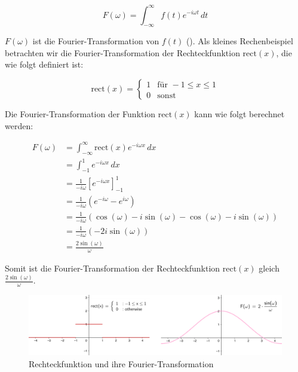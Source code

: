 \documentclass[11pt,a4paper]{article}
\begin{document}
\begin{equation*}
	F(\omega) = \int_{-\infty}^{\infty} f(t) e^{-i \omega t} \, dt
	\label{eq:fourier_transform}
\end{equation*}

\noindent
\(F(\omega)\) ist die Fourier-Transformation von \(f(t)\)
(\cite[49:27]{weitz2023fourier}). Als kleines Rechenbeispiel betrachten wir die
Fourier-Transformation der Rechteckfunktion \( \text{rect}(x) \), die wie folgt definiert ist:

\[
	\text{rect}(x) =
	\begin{cases}
		1 & \text{für } -1 \leq x \leq 1 \\
		0 & \text{sonst}
	\end{cases}
\]

\noindent
Die Fourier-Transformation der Funktion \( \text{rect}(x) \) kann wie folgt berechnet werden:

\begin{equation*}
	\begin{split}
		F(\omega) &= \int_{-\infty}^{\infty} \text{rect}(x) e^{-i \omega x} \, dx \\
		&= \int_{-1}^{1} e^{-i \omega x} \, dx \\
		&= \frac{1}{-i \omega} \left[ e^{-i \omega x} \right]_{-1}^{1} \\
		&= \frac{1}{-i \omega} \left( e^{-i \omega} - e^{i \omega} \right) \\
		&= \frac{1}{-i \omega} \left( \cos(\omega) - i \sin(\omega) - \cos(\omega) - i \sin(\omega) \right) \\
		&= \frac{1}{-i \omega} \left( -2 i \sin(\omega) \right) \\
		&= \frac{2 \sin(\omega)}{\omega}
	\end{split}
\end{equation*}
\noindent

\noindent
\newline
Somit ist die Fourier-Transformation der Rechteckfunktion \( \text{rect}(x) \) gleich
\( \displaystyle\frac{2 \sin(\omega)}{\omega} \).

\begin{figure}[h]
	\centering
	\includegraphics[width=0.8\linewidth]{img/example-fourier-trans.png}
	\caption{Rechteckfunktion und ihre Fourier-Transformation}
	\label{fig:fourier_transform}
\end{figure}
\end{document}
